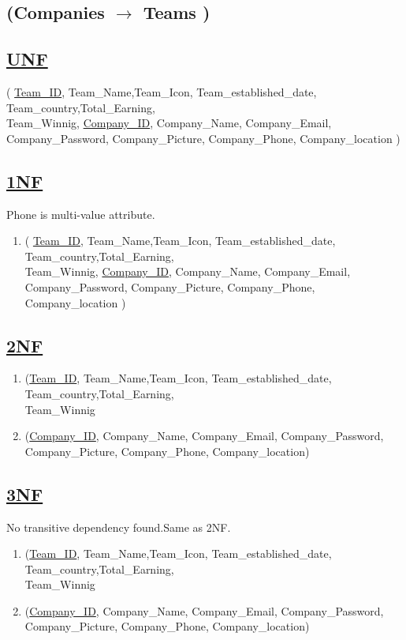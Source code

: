 \subsection{\texorpdfstring{\centering (Companies $\rightarrow$ Teams )}{ (Companies - Teams )}}

\subsection*{\underline{UNF}}

(
\underline{Team\_ID}, Team\_Name,Team\_Icon, Team\_established\_date, Team\_country,Total\_Earning,\\Team\_Winnig,
\underline{Company\_ID}, Company\_Name, Company\_Email, Company\_Password, Company\_Picture, Company\_Phone, Company\_location
)

\subsection*{\underline{1NF}}
Phone is multi-value attribute.

\begin{enumerate}
    \item (
          \underline{Team\_ID}, Team\_Name,Team\_Icon, Team\_established\_date, Team\_country,Total\_Earning,\\Team\_Winnig,
          \underline{Company\_ID}, Company\_Name, Company\_Email, Company\_Password, Company\_Picture, Company\_Phone, Company\_location
          )
\end{enumerate}

\subsection*{\underline{2NF}}
\begin{enumerate}
    \item (\underline{Team\_ID}, Team\_Name,Team\_Icon, Team\_established\_date, Team\_country,Total\_Earning,\\Team\_Winnig
    \item (\underline{Company\_ID}, Company\_Name, Company\_Email, Company\_Password, Company\_Picture, Company\_Phone, Company\_location)
\end{enumerate}

\subsection*{\underline{3NF}}
No transitive dependency found.Same as 2NF.
\begin{enumerate}
    \item (\underline{Team\_ID}, Team\_Name,Team\_Icon, Team\_established\_date, Team\_country,Total\_Earning,\\Team\_Winnig
    \item (\underline{Company\_ID}, Company\_Name, Company\_Email, Company\_Password, Company\_Picture, Company\_Phone, Company\_location)
\end{enumerate}

